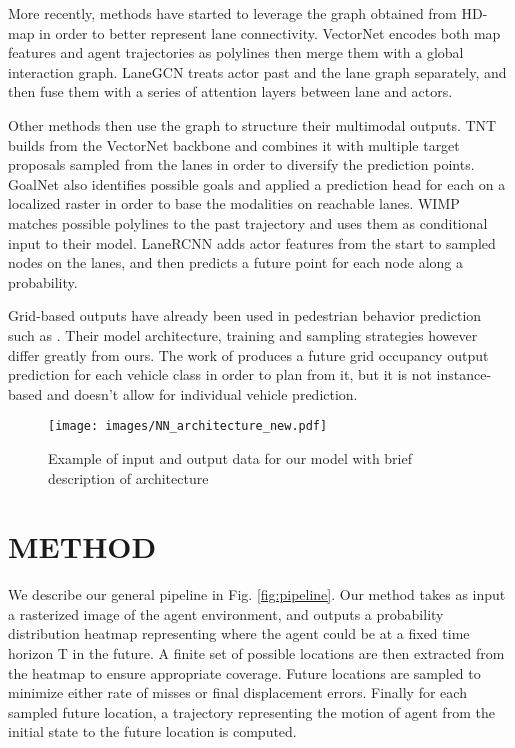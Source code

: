 \documentclass[letterpaper, 10 pt, conference]{ieeeconf}
\begin{document}
More recently, methods have started to leverage the graph obtained from HD-map  in order to better represent lane connectivity. VectorNet \cite{gao2020vectornet} encodes both map features and agent trajectories as polylines then merge them with a global interaction graph. LaneGCN \cite{liang2020learning} treats actor past and the lane graph separately, and then fuse them with a series of attention layers between lane and actors. 


Other methods then use the graph to structure their multimodal outputs. TNT \cite{zhao2020tnt} builds from the VectorNet backbone and combines it with multiple target proposals sampled from the lanes in order to diversify the prediction points. GoalNet \cite{zhang2020map} also identifies possible goals and applied a prediction head for each on a localized raster in order to base the modalities on reachable lanes. WIMP \cite{khandelwal2020if} matches possible polylines to the past trajectory and uses them as conditional input to their model. LaneRCNN \cite{zeng2021lanercnn} adds actor features from the start to sampled nodes on the lanes, and then predicts a future point for each node along a probability. 

Grid-based outputs have already been used in pedestrian behavior prediction such as \cite{liang2020garden, deo2020trajectory, mangalam2020goals, jain2020discrete, ridel2020scene}. Their model architecture, training and sampling strategies however differ greatly from ours. The work of \cite{sadat2020perceive} produces a future grid occupancy output prediction for each vehicle class in order to plan from it, but it is not instance-based and doesn't allow for individual vehicle prediction.

\begin{figure*}[t]
\centerline{\texttt{[image: images/NN\_architecture\_new.pdf]}}
\caption{Example of input and output data for our model with brief description of architecture}
\label{fig:in_out_archi}
\end{figure*}


\section{METHOD}



We describe our general pipeline in Fig. \ref{fig:pipeline}. Our method takes as input a rasterized image of the agent environment, and outputs a probability distribution heatmap representing where the agent could be at a fixed time horizon T in the future. A finite set of possible locations are then extracted from the heatmap to ensure appropriate coverage. Future locations are sampled to minimize either rate of misses or final displacement errors. Finally for each sampled future location, a trajectory representing the motion of agent from the initial state to the future location is computed.
\end{document}
